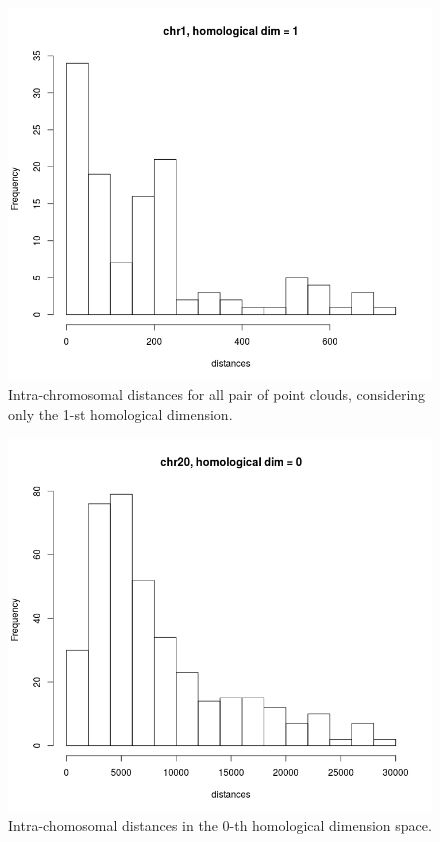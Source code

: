 \documentclass[12pt,a4paper]{article}
\begin{document}
\begin{figure}[hbtp]
\centering
\includegraphics[scale=0.75]{2wd_chr1_dim1_16clouds.png}
\caption{Intra-chromosomal distances for all pair of point clouds, considering only the 1-st homological dimension.}
\label{fig:dist_1d_intra_chr1}
\end{figure}

\begin{figure}[hbtp]
\centering
\includegraphics[scale=0.75]{2wd_chr20_dim0_28clouds.png}
\caption{Intra-chomosomal distances in the 0-th homological dimension space.}
\label{fig:dist_0d_intra_chr20}
\end{figure}
\end{document}
